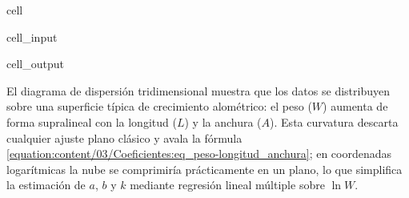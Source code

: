 \documentclass[a4paper,10pt,spanish]{jupyterBook}
\begin{document}
\begin{sphinxuseclass}{cell}
\begin{sphinxVerbatimInput}
\begin{sphinxuseclass}{cell_input}
\begin{sphinxVerbatim}[commandchars=\\\{\}]
   
           

\PYG{p}{[}  \PYG{p}{]}
   
\end{sphinxVerbatim}

\end{sphinxuseclass}\end{sphinxVerbatimInput}
\begin{sphinxVerbatimOutput}

\begin{sphinxuseclass}{cell_output}
\noindent{}

\end{sphinxuseclass}\end{sphinxVerbatimOutput}

\end{sphinxuseclass}
\sphinxAtStartPar
El diagrama de dispersión tridimensional muestra que los datos se distribuyen sobre una superficie típica de crecimiento alométrico: el peso (\(W\)) aumenta de forma supralineal con la longitud (\(L\)) y la anchura (\(A\)). Esta curvatura descarta cualquier ajuste plano clásico y avala la fórmula \eqref{equation:content/03/Coeficientes:eq_peso-longitud_anchura}; en coordenadas logarítmicas la nube se comprimiría prácticamente en un plano, lo que simplifica la estimación de \(a\), \(b\) y \(k\) mediante regresión lineal múltiple sobre \(\ln W\).
\end{document}
